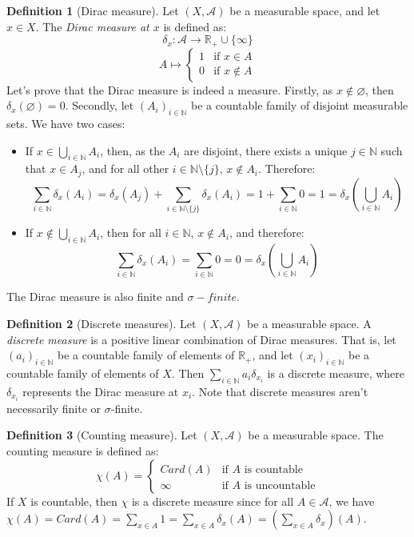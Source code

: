 \documentclass{article}
\theoremstyle{definition}
\newtheorem{definition}{Definition}[section]
\theoremstyle{remark}
\theoremstyle{example}
\newcommand{\tif}{\text{if }}
\begin{document}
\begin{definition}[Dirac measure]
    Let $(X, \mathcal{A})$ be a measurable space, and let $x \in X$. The \textit{Dirac measure at $x$} is defined as:
        $$\delta_x : \mathcal{A} \rightarrow \mathbb{R}_+ \cup \{\infty\}$$
        $$A \mapsto \begin{cases} 1 & \tif x \in A\\ 0 & \tif x \notin A\end{cases}$$
    Let's prove that the Dirac measure is indeed a measure. Firstly, as $x \notin \varnothing$, then $\delta_x(\varnothing) = 0$. Secondly, let $(A_i)_{i \in \mathbb{N}}$ be a countable family of disjoint measurable sets. We have two cases:
    \begin{itemize}
        \item If $x \in \bigcup_{i \in \mathbb{N}} A_i$, then, as the $A_i$ are disjoint, there exists a unique $j \in \mathbb{N}$ such that $x \in A_j$, and for all other $i \in \mathbb{N} \setminus \{j\}$, $x \notin A_i$. Therefore:
            $$\sum_{i \in \mathbb{N}} \delta_x(A_i) = \delta_x(A_j) + \sum_{i \in \mathbb{N} \setminus \{j\}} \delta_x(A_i) = 1 + \sum_{i \in \mathbb{N}} 0 = 1 = \delta_x(\bigcup_{i \in \mathbb{N}} A_i)$$
        \item If $x \notin \bigcup_{i \in \mathbb{N}} A_i$, then for all $i \in \mathbb{N}$, $x \notin A_i$, and therefore:
        $$\sum_{i \in \mathbb{N}} \delta_x(A_i) = \sum_{i \in \mathbb{N}} 0 = 0 = \delta_x(\bigcup_{i \in \mathbb{N}} A_i)$$
    \end{itemize}
    The Dirac measure is also finite and $\sigma-finite$.
\end{definition}

\begin{definition}[Discrete measures]
    Let $(X, \mathcal{A})$ be a measurable space. A \textit{discrete measure} is a positive linear combination of Dirac measures. That is, let $(a_i)_{i \in \mathbb{N}}$ be a countable family of elements of $\mathbb{R}_+$, and let $(x_i)_{i \in \mathbb{N}}$ be a countable family of elements of $X$. Then $\sum_{i \in \mathbb{N}} a_i \delta_{x_i}$ is a discrete measure, where $\delta_{x_i}$ represents the Dirac measure at $x_i$. Note that discrete measures aren't necessarily finite or $\sigma$-finite.
\end{definition}

\begin{definition}[Counting measure]
    Let $(X, \mathcal{A})$ be a measurable space. The counting measure is defined as:
        $$\chi(A) = \begin{cases} Card(A) & \tif A \text{ is countable}\\ \infty & \tif A \text{ is uncountable}\end{cases}$$
    If $X$ is countable, then $\chi$ is a discrete measure since for all $A \in \mathcal{A}$, we have $\chi(A) = Card(A) = \sum_{x \in A} 1 = \sum_{x \in A} \delta_x(A) = \left(\sum_{x \in A} \delta_x\right)(A)$.
\end{definition}
\end{document}
